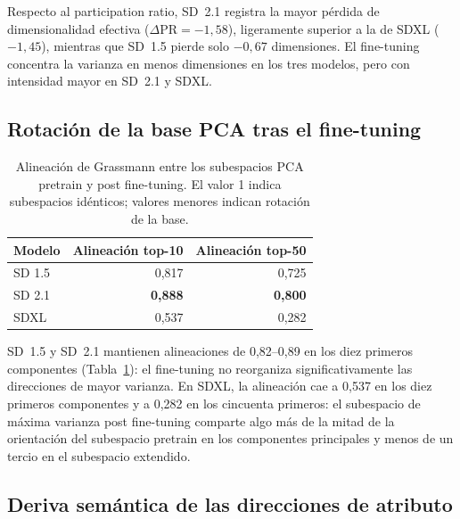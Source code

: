 \documentclass[12pt, a4paper, twoside]{book}
\begin{document}
Respecto al participation ratio, SD~2.1 registra la mayor pérdida de dimensionalidad efectiva
($\Delta\text{PR} = -1{,}58$), ligeramente superior a la de SDXL ($-1{,}45$), mientras que
SD~1.5 pierde solo $-0{,}67$ dimensiones. El fine-tuning concentra la varianza en menos
dimensiones en los tres modelos, pero con intensidad mayor en SD~2.1 y SDXL.

\subsection{Rotación de la base PCA tras el fine-tuning}
\label{subsec:res:pca_alineacion}

\begin{table}[htb]
\centering
\caption{Alineación de Grassmann entre los subespacios PCA pretrain y post fine-tuning.
El valor 1 indica subespacios idénticos; valores menores indican rotación de la base.}
\label{tab:pca_alineacion}
\small
\begin{tabular}{lrr}
\toprule
\textbf{Modelo} & \textbf{Alineación top-10} & \textbf{Alineación top-50} \\
\midrule
SD 1.5 & 0,817 & 0,725 \\
SD 2.1 & \textbf{0,888} & \textbf{0,800} \\
SDXL   & 0,537 & 0,282 \\
\bottomrule
\end{tabular}
\end{table}

SD~1.5 y SD~2.1 mantienen alineaciones de 0,82--0,89 en los diez primeros componentes
(Tabla~\ref{tab:pca_alineacion}): el fine-tuning no reorganiza significativamente las
direcciones de mayor varianza.
En SDXL, la alineación cae a 0,537 en los diez primeros componentes y a 0,282 en los
cincuenta primeros: el subespacio de máxima varianza post fine-tuning comparte algo más de
la mitad de la orientación del subespacio pretrain en los componentes principales y menos
de un tercio en el subespacio extendido.

\subsection{Deriva semántica de las direcciones de atributo}
\label{subsec:res:deriva_semantica}
\end{document}
